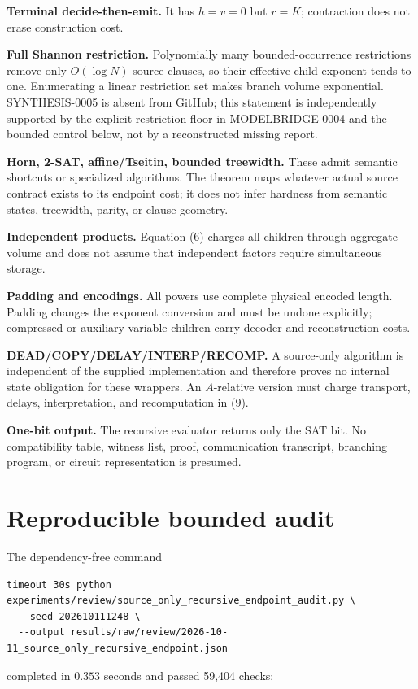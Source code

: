 \documentclass[11pt]{article}
\begin{document}
\begin{description}[leftmargin=0cm,labelwidth=0cm]
\item[] \textbf{Terminal decide-then-emit.}
It has $h=v=0$ but $r=K$; contraction does not erase construction cost.
\item[] \textbf{Full Shannon restriction.}
Polynomially many bounded-occurrence restrictions remove only $O(\log N)$
source clauses, so their effective child exponent tends to one.  Enumerating
a linear restriction set makes branch volume exponential.  SYNTHESIS-0005 is
absent from GitHub; this statement is independently supported by the explicit
restriction floor in MODELBRIDGE-0004 and the bounded control below, not by a
reconstructed missing report.
\item[] \textbf{Horn, 2-SAT, affine/Tseitin, bounded treewidth.}
These admit semantic shortcuts or specialized algorithms.  The theorem maps
whatever actual source contract exists to its endpoint cost; it does not
infer hardness from semantic states, treewidth, parity, or clause geometry.
\item[] \textbf{Independent products.}
Equation (6) charges all children through aggregate volume and does not assume
that independent factors require simultaneous storage.
\item[] \textbf{Padding and encodings.}
All powers use complete physical encoded length.  Padding changes the exponent
conversion and must be undone explicitly; compressed or auxiliary-variable
children carry decoder and reconstruction costs.
\item[] \textbf{DEAD/COPY/DELAY/INTERP/RECOMP.}
A source-only algorithm is independent of the supplied implementation and
therefore proves no internal state obligation for these wrappers.  An
$A$-relative version must charge transport, delays, interpretation, and
recomputation in (9).
\item[] \textbf{One-bit output.}
The recursive evaluator returns only the SAT bit.  No compatibility table,
witness list, proof, communication transcript, branching program, or circuit
representation is presumed.
\end{description}

\section{Reproducible bounded audit}

The dependency-free command
\begin{verbatim}
timeout 30s python experiments/review/source_only_recursive_endpoint_audit.py \
  --seed 202610111248 \
  --output results/raw/review/2026-10-11_source_only_recursive_endpoint.json
\end{verbatim}
completed in $0.353$ seconds and passed 59,404 checks:
\end{document}
